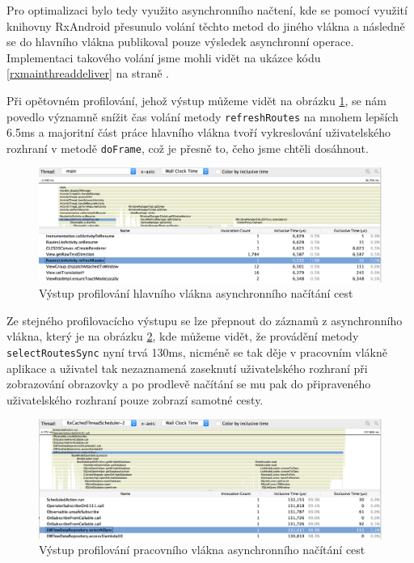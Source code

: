 \documentclass[czech,master,public,dept460,male,java,cpdeclaration]{diploma}
\begin{document}
 Pro optimalizaci bylo tedy využito asynchronního načtení, kde se pomocí využití knihovny RxAndroid
 přesunulo volání těchto metod do jiného vlákna a následně se do hlavního vlákna publikoval
 pouze výsledek asynchronní operace. Implementaci takového volání jsme mohli vidět na ukázce kódu
 \ref{rxmainthreaddeliver} na straně \pageref{rxmainthreaddeliver}.

 Při opětovném profilování, jehož výstup můžeme vidět na obrázku \ref{fig:asyncroutesmainthread},
 se nám povedlo významně snížit čas volání metody \texttt{refreshRoutes} na mnohem lepších 6.5ms
 a majoritní část práce hlavního vlákna tvoří vykreslování uživatelského rozhraní v metodě
 \texttt{doFrame}, což je přesně to, čeho jsme chtěli dosáhnout.

 \begin{figure}[H]
           \centering
                   \includegraphics[scale=0.38]{img/AsyncRoutesMainThread.png}
           \caption{Výstup profilování hlavního vlákna asynchronního načítání cest}
           \label{fig:asyncroutesmainthread}
   \end{figure}

Ze stejného profilovacícho výstupu se lze přepnout do záznamů z asynchronního vlákna, který je
na obrázku \ref{fig:asyncroutesrxthread}, kde můžeme vidět, že provádění metody
\texttt{selectRoutesSync} nyní trvá 130ms, nicméně se tak děje v pracovním vlákně aplikace a uživatel
 tak nezaznamená zaseknutí uživatelského rozhraní při zobrazování obrazovky a po prodlevě načítání
 se mu pak do připraveného uživatelského rozhraní pouze zobrazí samotné cesty.

    \begin{figure}[H]
              \centering
                      \includegraphics[scale=0.38]{img/AsyncRoutesRxThread.png}
              \caption{Výstup profilování pracovního vlákna asynchronního načítání cest}
              \label{fig:asyncroutesrxthread}
      \end{figure}
\end{document}

